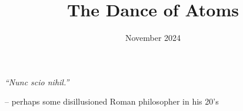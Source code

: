 \documentclass[a4paper, 11pt, oneside]{Thesis}  %
\begin{document}
\frontmatter      %

\title  {The Dance of Atoms}
\addresses  {\groupname\\\deptname\\\univname}  %
\date       {November 2024}
\subject    {}
\keywords   {}

\maketitle

\fancyhead{}  %
\rhead{\thepage}  %
\lhead{}  %

\pagestyle{fancy}  %

\pagestyle{empty}  %

\null\vfill
\textit{``Nunc scio nihil.''}

\begin{flushright}
-- perhaps some disillusioned Roman philosopher in his 20's
\end{flushright}

\vfill\vfill\vfill\vfill\vfill\vfill\null
\clearpage  %
\end{document}
